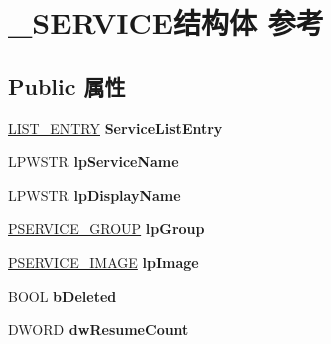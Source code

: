 \hypertarget{struct___s_e_r_v_i_c_e}{}\section{\+\_\+\+S\+E\+R\+V\+I\+C\+E结构体 参考}
\label{struct___s_e_r_v_i_c_e}
\subsection*{Public 属性}
\begin{DoxyCompactItemize}
\item 
\mbox{\label{struct___s_e_r_v_i_c_e_a6d21c456e4b12f8c2ad28bde26234b1f}} 
\hyperlink{struct___l_i_s_t___e_n_t_r_y}{L\+I\+S\+T\+\_\+\+E\+N\+T\+RY} {\bfseries Service\+List\+Entry}
\item 
\mbox{\label{struct___s_e_r_v_i_c_e_af4a92f3cb208eb4074df5b2bc7ea5acc}} 
L\+P\+W\+S\+TR {\bfseries lp\+Service\+Name}
\item 
\mbox{\label{struct___s_e_r_v_i_c_e_a6848b14f3952f01fd0f1d5cf090a5521}} 
L\+P\+W\+S\+TR {\bfseries lp\+Display\+Name}
\item 
\mbox{\label{struct___s_e_r_v_i_c_e_a395b1b0cf798e8f4a547556bc58850a2}} 
\hyperlink{struct___s_e_r_v_i_c_e___g_r_o_u_p}{P\+S\+E\+R\+V\+I\+C\+E\+\_\+\+G\+R\+O\+UP} {\bfseries lp\+Group}
\item 
\mbox{\label{struct___s_e_r_v_i_c_e_ad2748d4cc4b81c0901112d9e7b211611}} 
\hyperlink{struct___s_e_r_v_i_c_e___i_m_a_g_e}{P\+S\+E\+R\+V\+I\+C\+E\+\_\+\+I\+M\+A\+GE} {\bfseries lp\+Image}
\item 
\mbox{\label{struct___s_e_r_v_i_c_e_a045b38bd651fe909d0f93dd159caf846}} 
B\+O\+OL {\bfseries b\+Deleted}
\item 
\mbox{\label{struct___s_e_r_v_i_c_e_a8bbd876fe035d2090eba08b076b12228}} 
D\+W\+O\+RD {\bfseries dw\+Resume\+Count}
\item 
\mbox{\label{struct___s_e_r_v_i_c_e_aeaee28ab0dc9e7844d9ef4a0d52fb106}} 

\end{DoxyCompactItemize}
